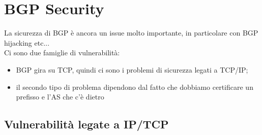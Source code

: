 \documentclass[12pt, oneside]{extbook} %
\begin{document}
\section{BGP Security}
La sicurezza di BGP è ancora un issue molto importante, in particolare con BGP hijacking etc...\\Ci sono due famiglie di vulnerabilità:
\begin{itemize}
\item BGP gira su TCP, quindi ci sono i problemi di sicurezza legati a TCP/IP;
\item il secondo tipo di problema dipendono dal fatto che dobbiamo certificare un prefisso e l'AS che c'è dietro
\end{itemize}
\subsection{Vulnerabilità legate a IP/TCP}
\end{document}
